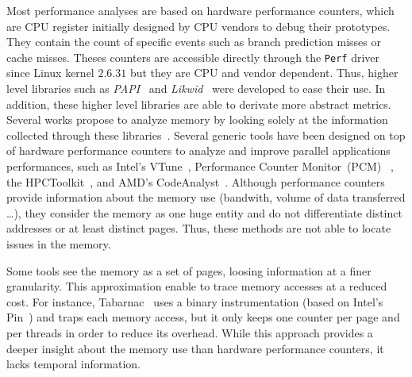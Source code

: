 Most performance analyses are based on hardware performance counters, which are CPU
register initially designed by CPU vendors to debug their prototypes. They contain
the count of specific events such as branch prediction misses or cache misses.
Theses counters are accessible directly  through the \texttt{Perf} driver
since Linux kernel $2.6.31$ but they are CPU and vendor dependent. Thus, higher
level libraries such as \emph{PAPI}~\cite{Weaver13PAPI} and
\emph{Likwid}~\cite{Treibig10LIKWID} were developed to ease their use.
In addition, these higher level libraries are able to derivate more abstract metrics. Several works propose to analyze memory 
by looking solely at the information collected through these
libraries~\cite{Majo13(Mis)understanding,
Jiang14Understanding,Bosch00Rivet,Weyers14Visualization,Tao01Visualizing,DeRose01Hardware}.
%
Several generic tools have been designed on top of hardware performance counters
to analyze and improve parallel applications performances, such as Intel's
VTune~\cite{Reinders05VTune}, Performance Counter
Monitor~(PCM)~%
, the HPCToolkit~\cite{Adhianto10HPCTOOLKIT},
and AMD's CodeAnalyst~\cite{Drongowski08introduction}.
%
Although performance counters provide information about the memory use
(bandwith, volume of data transferred \ldots),  they consider the memory as
one huge entity and do not differentiate distinct addresses or at least
distinct pages. Thus, these methods are not able to locate issues in the memory.

Some tools see the memory as a set of pages, loosing information at a finer
granularity. This approximation enable to trace memory accesses at a reduced
cost. For instance, \gls{Tabarnac}~\cite{Beniamine15TABARNAC} uses a binary
instrumentation (based on Intel's Pin~\cite{Luk05Pin}) and traps each
memory access, but it only keeps one counter per page and per threads in order to
reduce its overhead. While this approach provides a deeper insight about the
memory use than hardware performance counters, it lacks temporal information.

